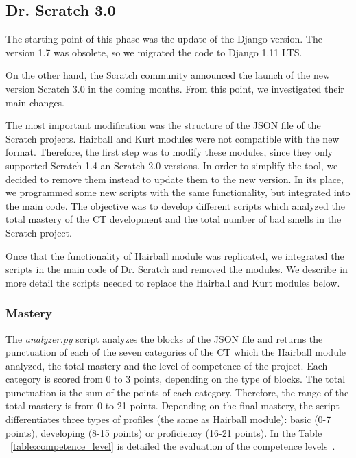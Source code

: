 \subsection{Dr. Scratch 3.0}
\label{subsec:newversion}

The starting point of this phase was the update of the Django version. The version 1.7 was obsolete, so we migrated the code to Django 1.11 LTS. 

On the other hand, the Scratch community announced the launch of the new version Scratch 3.0 in the coming months. From this point, we investigated their main changes. 

The most important modification was the structure of the JSON file of the Scratch projects. Hairball and Kurt modules were not compatible with the new format. Therefore, the first step was to modify these modules, since they only supported Scratch 1.4 an Scratch 2.0 versions. In order to simplify the tool, we decided to remove them instead to update them to the new version. In its place, we programmed some new scripts with the same functionality, but integrated into the main code. The objective was to develop different scripts which analyzed the total mastery of the CT development and the total number of bad smells in the Scratch project. 

Once that the functionality of Hairball module was replicated, we integrated the scripts in the main code of Dr. Scratch and removed the modules. We describe in more detail the scripts needed to replace the Hairball and Kurt modules below. 

\subsubsection{Mastery}
\label{subsubsec:mastery}

The \textit{analyzer.py} script analyzes the blocks of the JSON file and returns the punctuation of each of the seven categories of the CT which the Hairball module analyzed, the total mastery and the level of competence of the project. Each category is scored from 0 to 3 points, depending on the type of blocks. The total punctuation is the sum of the points of each category. Therefore, the range of the total mastery is from 0 to 21 points. Depending on the final mastery, the script differentiates three types of profiles (the same as Hairball module): basic (0-7 points), developing (8-15 points) or proficiency (16-21 points). In the Table ~\ref{table:competence_level} is detailed the evaluation of the competence levels~\cite{moreno2015dr}.

